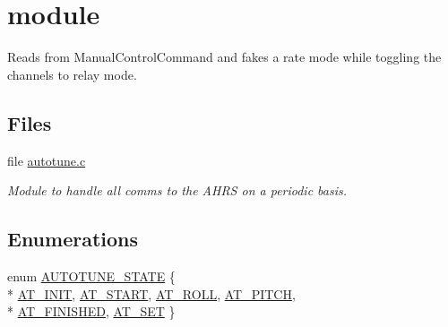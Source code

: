 \hypertarget{group___autotuning}{\section{module}
\label{group___autotuning}
}


Reads from Manual\-Control\-Command and fakes a rate mode while toggling the channels to relay mode.  


\subsection*{Files}
\begin{DoxyCompactItemize}
\item 
file \hyperlink{autotune_8c}{autotune.\-c}
\begin{DoxyCompactList}\small\item\em Module to handle all comms to the A\-H\-R\-S on a periodic basis. \end{DoxyCompactList}\end{DoxyCompactItemize}
\subsection*{Enumerations}
\begin{DoxyCompactItemize}
\item 
enum \hyperlink{group___autotuning_gac104fc2be1ec1bdac638e8bb7fa4ce7a}{A\-U\-T\-O\-T\-U\-N\-E\-\_\-\-S\-T\-A\-T\-E} \{ \\*
\hyperlink{group___autotuning_ggac104fc2be1ec1bdac638e8bb7fa4ce7aa212188919cef420e2de9232d9029a92b}{A\-T\-\_\-\-I\-N\-I\-T}, 
\hyperlink{group___autotuning_ggac104fc2be1ec1bdac638e8bb7fa4ce7aa593de3fe66dd4fb0c156ebe006f13c0d}{A\-T\-\_\-\-S\-T\-A\-R\-T}, 
\hyperlink{group___autotuning_ggac104fc2be1ec1bdac638e8bb7fa4ce7aa6efd216e71ef62290cda172d919990ab}{A\-T\-\_\-\-R\-O\-L\-L}, 
\hyperlink{group___autotuning_ggac104fc2be1ec1bdac638e8bb7fa4ce7aac1602077ee9f4897df7eaad0800cf52b}{A\-T\-\_\-\-P\-I\-T\-C\-H}, 
\\*
\hyperlink{group___autotuning_ggac104fc2be1ec1bdac638e8bb7fa4ce7aa160493d923f91bf421ce49dd525a54ee}{A\-T\-\_\-\-F\-I\-N\-I\-S\-H\-E\-D}, 
\hyperlink{group___autotuning_ggac104fc2be1ec1bdac638e8bb7fa4ce7aa558d9f3a1ed056f22c855a7058864461}{A\-T\-\_\-\-S\-E\-T}
 \}
\end{DoxyCompactItemize}
